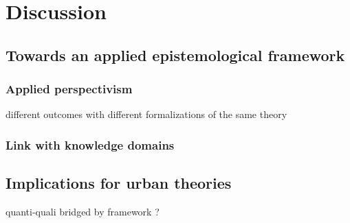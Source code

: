 \section{Discussion}


\subsection{Towards an applied epistemological framework}

\subsubsection{Applied perspectivism}

\cite{muelder2018} different outcomes with different formalizations of the same theory


\subsubsection{Link with knowledge domains}





\subsection{Implications for urban theories}



\cite{white2017necessity}



\cite{anzoise2017perception}




\cite{shah2006building} quanti-quali bridged by framework ?


